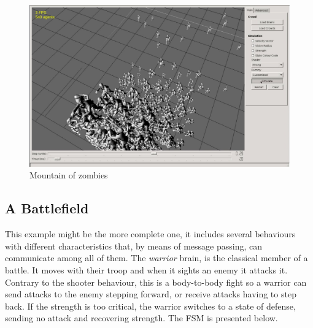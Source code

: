 \begin{figure}[!h]
  \centering
	\includegraphics[scale=0.5]{zombies_03.eps}
	\caption{Mountain of zombies}
  \label{fig:zombieCaptures}
\end{figure}

\newpage
\subsection{A Battlefield}

This example might be the more complete one, it includes several behaviours with different characteristics that, by means of message passing, can communicate among all of them. The \emph{warrior} brain, is the classical member of a battle. It moves with their troop and when it sights an enemy it attacks it. Contrary to the shooter behaviour, this is a body-to-body fight so a warrior can send attacks to the enemy stepping forward, or receive attacks having to step back. If the strength is too critical, the warrior switches to a state of defense, sending no attack and recovering strength. The FSM is presented below.


